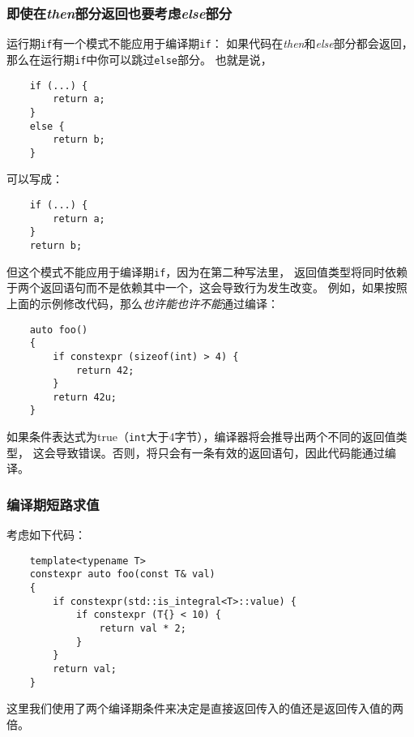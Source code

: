 \subsubsection{即使在\emph{then}部分返回也要考虑\emph{else}部分}
运行期\texttt{if}有一个模式不能应用于编译期\texttt{if}：
如果代码在\emph{then}和\emph{else}部分都会返回，
那么在运行期\texttt{if}中你可以跳过\texttt{else}部分。
也就是说，
\begin{lstlisting}
    if (...) {
        return a;
    }
    else {
        return b;
    }
\end{lstlisting}
可以写成：
\begin{lstlisting}
    if (...) {
        return a;
    }
    return b;
\end{lstlisting}
但这个模式不能应用于编译期\texttt{if}，因为在第二种写法里，
返回值类型将同时依赖于两个返回语句而不是依赖其中一个，这会导致行为发生改变。
例如，如果按照上面的示例修改代码，那么\emph{也许能也许不能}通过编译：
\begin{lstlisting}
    auto foo()
    {
        if constexpr (sizeof(int) > 4) {
            return 42;
        }
        return 42u;
    }
\end{lstlisting}
如果条件表达式为true（\texttt{int}大于4字节），编译器将会推导出两个不同的返回值类型，
这会导致错误。否则，将只会有一条有效的返回语句，因此代码能通过编译。

\subsubsection{编译期短路求值}
考虑如下代码：
\begin{lstlisting}
    template<typename T>
    constexpr auto foo(const T& val)
    {
        if constexpr(std::is_integral<T>::value) {
            if constexpr (T{} < 10) {
                return val * 2;
            }
        }
        return val;
    }
\end{lstlisting}
这里我们使用了两个编译期条件来决定是直接返回传入的值还是返回传入值的两倍。

